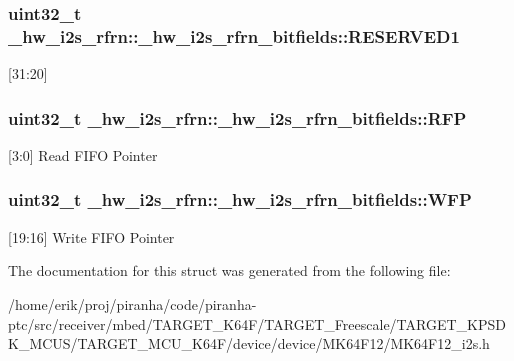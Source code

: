 \subsubsection[{\texorpdfstring{R\+E\+S\+E\+R\+V\+E\+D1}{RESERVED1}}]{\setlength{\rightskip}{0pt plus 5cm}uint32\+\_\+t \+\_\+hw\+\_\+i2s\+\_\+rfrn\+::\+\_\+hw\+\_\+i2s\+\_\+rfrn\+\_\+bitfields\+::\+R\+E\+S\+E\+R\+V\+E\+D1}\hypertarget{struct__hw__i2s__rfrn_1_1__hw__i2s__rfrn__bitfields_a0d0d0510a667cd593b1b016fdf6ef214}{}\label{struct__hw__i2s__rfrn_1_1__hw__i2s__rfrn__bitfields_a0d0d0510a667cd593b1b016fdf6ef214}
\mbox{[}31\+:20\mbox{]} 
\subsubsection[{\texorpdfstring{R\+FP}{RFP}}]{\setlength{\rightskip}{0pt plus 5cm}uint32\+\_\+t \+\_\+hw\+\_\+i2s\+\_\+rfrn\+::\+\_\+hw\+\_\+i2s\+\_\+rfrn\+\_\+bitfields\+::\+R\+FP}\hypertarget{struct__hw__i2s__rfrn_1_1__hw__i2s__rfrn__bitfields_a0f11c23ffebb12ae3962ba83120206a0}{}\label{struct__hw__i2s__rfrn_1_1__hw__i2s__rfrn__bitfields_a0f11c23ffebb12ae3962ba83120206a0}
\mbox{[}3\+:0\mbox{]} Read F\+I\+FO Pointer 
\subsubsection[{\texorpdfstring{W\+FP}{WFP}}]{\setlength{\rightskip}{0pt plus 5cm}uint32\+\_\+t \+\_\+hw\+\_\+i2s\+\_\+rfrn\+::\+\_\+hw\+\_\+i2s\+\_\+rfrn\+\_\+bitfields\+::\+W\+FP}\hypertarget{struct__hw__i2s__rfrn_1_1__hw__i2s__rfrn__bitfields_ae8d132c5f0b84a19c7671d55f603f067}{}\label{struct__hw__i2s__rfrn_1_1__hw__i2s__rfrn__bitfields_ae8d132c5f0b84a19c7671d55f603f067}
\mbox{[}19\+:16\mbox{]} Write F\+I\+FO Pointer 

The documentation for this struct was generated from the following file\+:\begin{DoxyCompactItemize}
\item 
/home/erik/proj/piranha/code/piranha-\/ptc/src/receiver/mbed/\+T\+A\+R\+G\+E\+T\+\_\+\+K64\+F/\+T\+A\+R\+G\+E\+T\+\_\+\+Freescale/\+T\+A\+R\+G\+E\+T\+\_\+\+K\+P\+S\+D\+K\+\_\+\+M\+C\+U\+S/\+T\+A\+R\+G\+E\+T\+\_\+\+M\+C\+U\+\_\+\+K64\+F/device/device/\+M\+K64\+F12/M\+K64\+F12\+\_\+i2s.\+h\end{DoxyCompactItemize}
